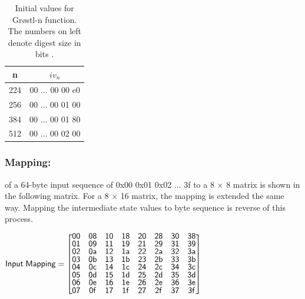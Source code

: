   \begin{table}
    \begin{center}
      \begin{tabular}{ *{2}{c} } \hline
        n   & $iv_{n}$         \\ \hline
        224 & 00 $\dots$ 00 00 e0 \\
        256 & 00 $\dots$ 00 01 00 \\
        384 & 00 $\dots$ 00 01 80 \\
        512 & 00 $\dots$ 00 02 00 \\ \hline
      \end{tabular}
    \caption{Initial values for Gr{\o}stl-n function. The numbers on left denote digest size in bits \cite{00019}.}
    \end{center}
  \end{table}

\newpage
    \subsubsection{Mapping:} of a 64-byte input sequence of 0x00 0x01 0x02 $\ldots$ 3f to a 8 $\times$ 8 matrix is shown 
    in the following matrix. For a 8 $\times$ 16 matrix, the mapping is extended the same way. Mapping the intermediate 
    state values to byte sequence is reverse of this process. \\
     \begin{center}$\mathsf{Input\thickspace Mapping} = \renewcommand\arraystretch{0.75}
      \begin{bmatrix}
        \mathsf{00} & \mathsf{08} & \mathsf{10} & \mathsf{18} & \mathsf{20} & \mathsf{28} & \mathsf{30} & \mathsf{38} \\
        \mathsf{01} & \mathsf{09} & \mathsf{11} & \mathsf{19} & \mathsf{21} & \mathsf{29} & \mathsf{31} & \mathsf{39} \\
        \mathsf{02} & \mathsf{0a} & \mathsf{12} & \mathsf{1a} & \mathsf{22} & \mathsf{2a} & \mathsf{32} & \mathsf{3a} \\
        \mathsf{03} & \mathsf{0b} & \mathsf{13} & \mathsf{1b} & \mathsf{23} & \mathsf{2b} & \mathsf{33} & \mathsf{3b} \\
        \mathsf{04} & \mathsf{0c} & \mathsf{14} & \mathsf{1c} & \mathsf{24} & \mathsf{2c} & \mathsf{34} & \mathsf{3c} \\
        \mathsf{05} & \mathsf{0d} & \mathsf{15} & \mathsf{1d} & \mathsf{25} & \mathsf{2d} & \mathsf{35} & \mathsf{3d} \\
        \mathsf{06} & \mathsf{0e} & \mathsf{16} & \mathsf{1e} & \mathsf{26} & \mathsf{2e} & \mathsf{36} & \mathsf{3e} \\
        \mathsf{07} & \mathsf{0f} & \mathsf{17} & \mathsf{1f} & \mathsf{27} & \mathsf{2f} & \mathsf{37} & \mathsf{3f}
      \end{bmatrix}$\end{center}
      
